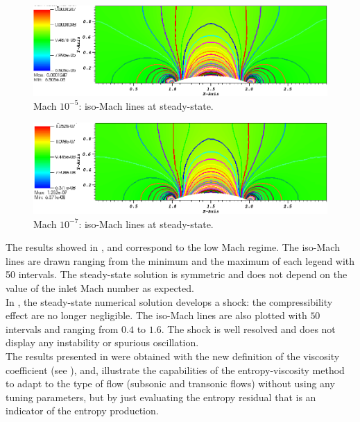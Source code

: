         \begin{figure}[H]%
                \centering
                \includegraphics[scale=.50]{figures/Hump2D_mach_1em4.png}
                \caption{Mach $10^{-5}$: iso-Mach lines at steady-state.}
                \label{fig:2d_hump_mach_0p0001}
        \end{figure}
        \begin{figure}[H]%
                \centering
                \includegraphics[scale=.50]{figures/Hump2D_mach_1em7.png}
                \caption{Mach $10^{-7}$: iso-Mach lines at steady-state.}
                \label{fig:2d_hump_mach_0p0000001}
        \end{figure}
The results showed in ,  and  correspond to the low Mach regime. The iso-Mach lines are drawn ranging from the minimum and the maximum of each legend with 50 intervals. The steady-state solution is symmetric and does not depend on the value of the inlet Mach number as expected. \\
In , the steady-state numerical solution develops a shock: the compressibility effect are no longer negligible. The iso-Mach lines are also plotted with $50$ intervals and ranging from $0.4$ to $1.6$. The shock is well resolved and does not display any instability or spurious oscillation. \\
The results presented in  were obtained with the new definition of the viscosity coefficient (see ), and, illustrate the capabilities of the entropy-viscosity method to adapt to the type of flow (subsonic and transonic flows) without using any tuning parameters, but by just evaluating the entropy residual that is an indicator of the entropy production.    
